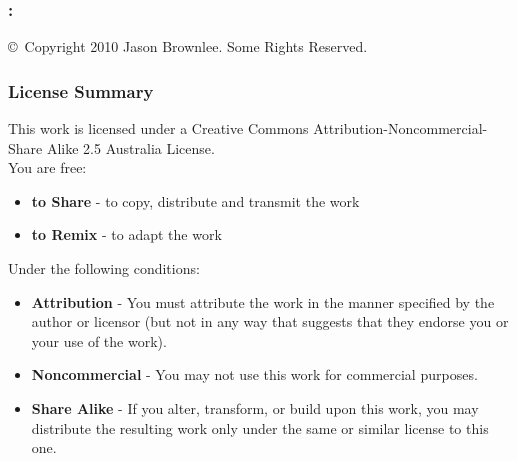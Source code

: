 

\begin{flushleft}

\vspace*{\fill}
\subsubsection*{\mybooktitle: \mybooksubtitle}
\copyright\ Copyright 2010 Jason Brownlee. Some Rights Reserved. \\

\subsubsection*{License Summary}
This work is licensed under a Creative Commons Attribution-Noncommercial-Share Alike 2.5 Australia License. \\

You are free:
\begin{itemize}
	\item \textbf{to Share} - to copy, distribute and transmit the work
	\item \textbf{to Remix} - to adapt the work
\end{itemize}

Under the following conditions:
\begin{itemize}
	\item \textbf{Attribution} - You must attribute the work in the manner specified by the author or licensor (but not in any way that suggests that they endorse you or your use of the work).
	\item \textbf{Noncommercial} - You may not use this work for commercial purposes.
	\item \textbf{Share Alike} - If you alter, transform, or build upon this work, you may distribute the resulting work only under the same or similar license to this one.
\end{itemize}


\end{flushleft}
